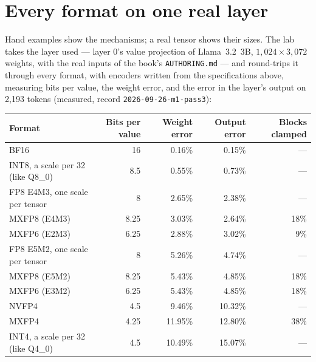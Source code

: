 \section{Every format on one real layer}

Hand examples show the mechanisms; a real tensor shows their sizes. The lab
takes the layer  used --- layer 0's value projection
of Llama~3.2~3B, $1{,}024 \times 3{,}072$ weights, with the real inputs of the
book's \texttt{AUTHORING.md} --- and round-trips it through every format, with
encoders written from the specifications above, measuring bits per value, the
weight error, and the error in the layer's output on 2,193 tokens (measured,
record \texttt{2026-09-26-m1-pass3}):

\begin{center}\small
\begin{tabular}{@{}lrrrr@{}}
\toprule
Format & Bits per value & Weight error & Output error & Blocks clamped \\
\midrule
BF16 & 16 & 0.16\% & 0.15\% & --- \\
INT8, a scale per 32 (like Q8\_0) & 8.5 & 0.55\% & 0.73\% & --- \\
FP8 E4M3, one scale per tensor & 8 & 2.65\% & 2.38\% & --- \\
MXFP8 (E4M3) & 8.25 & 3.03\% & 2.64\% & 18\% \\
MXFP6 (E2M3) & 6.25 & 2.88\% & 3.02\% & 9\% \\
FP8 E5M2, one scale per tensor & 8 & 5.26\% & 4.74\% & --- \\
MXFP8 (E5M2) & 8.25 & 5.43\% & 4.85\% & 18\% \\
MXFP6 (E3M2) & 6.25 & 5.43\% & 4.85\% & 18\% \\
NVFP4 & 4.5 & 9.46\% & 10.32\% & --- \\
MXFP4 & 4.25 & 11.95\% & 12.80\% & 38\% \\
INT4, a scale per 32 (like Q4\_0) & 4.5 & 10.49\% & 15.07\% & --- \\
\bottomrule
\end{tabular}
\end{center}

